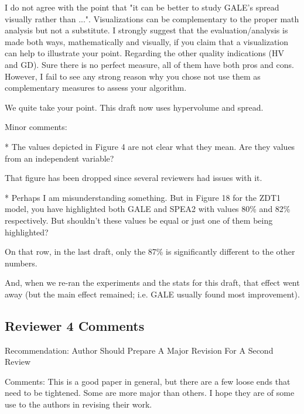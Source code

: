 \documentclass[10pt,journal,compsoc]{IEEEtran}
\newenvironment{changed}{\par\color{MyDarkBlue}}{\par}
\begin{document}
I do not agree with the point that "it can be better
to study GALE's spread visually rather than
...". Visualizations can be complementary to the
proper math analysis but not a substitute. I
strongly suggest that the evaluation/analysis is
made both ways, mathematically and visually, if you
claim that a visualization can help to illustrate
your point.
Regarding the other quality indications (HV and GD). Sure there is no perfect measure, all of them have both pros and cons. However, I fail to see any strong reason why you chose not use them as complementary measures to assess your algorithm.

\begin{changed}
We quite take your point. This draft now uses hypervolume and spread.
\end{changed}

Minor comments:

* The values depicted in Figure 4 are not clear what they mean. Are they values from an independent variable?


\begin{changed}
That figure has been dropped since several reviewers had issues with it.
\end{changed}

* Perhaps I am misunderstanding something. But in Figure 18 for the ZDT1 model, you have highlighted both GALE and SPEA2 with values 80\% and 82\% respectively. But shouldn't these values be equal or just one of them being highlighted?

\begin{changed}
On that row, in the last draft,
only the 87\% is significantly different to the other numbers.

And, when we re-ran the experiments and the stats for this draft, that effect
went away (but the main effect remained; i.e. GALE usually found most improvement).
\end{changed}

\subsection{Reviewer 4 Comments}

Recommendation: Author Should Prepare A Major Revision For A Second Review

Comments:
This is a good paper in general, but there are a few loose ends that need to be tightened. Some are more major than others. I hope they are of some use to the authors in revising their work.
\end{document}
